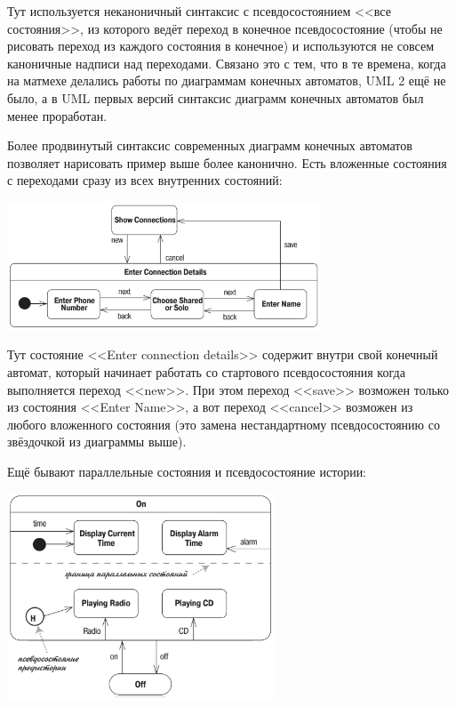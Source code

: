 \documentclass{../mcstext}
\begin{document}
Тут используется неканоничный синтаксис с псевдосостоянием <<все состояния>>, из которого ведёт переход в конечное псевдосостояние (чтобы не рисовать переход из каждого состояния в конечное) и используются не совсем каноничные надписи над переходами. Связано это с тем, что в те времена, когда на матмехе делались работы по диаграммам конечных автоматов, UML 2 ещё не было, а в UML первых версий синтаксис диаграмм конечных автоматов был менее проработан.

Более продвинутый синтаксис современных диаграмм конечных автоматов позволяет нарисовать пример выше более канонично. Есть вложенные состояния с переходами сразу из всех внутренних состояний:

\begin{center}
    \includegraphics[width=0.7\textwidth]{stateTransitionNestedStates.png}
\end{center}

Тут состояние <<Enter connection details>> содержит внутри свой конечный автомат, который начинает работать со стартового псевдосостояния когда выполняется переход <<new>>. При этом переход <<save>> возможен только из состояния <<Enter Name>>, а вот переход <<cancel>> возможен из любого вложенного состояния (это замена нестандартному псевдосостоянию со звёздочкой из диаграммы выше).

Ещё бывают параллельные состояния и псевдосостояние истории:

\begin{center}
    \includegraphics[width=0.6\textwidth]{stateTransitionParallelStates.png}
\end{center}
\end{document}

